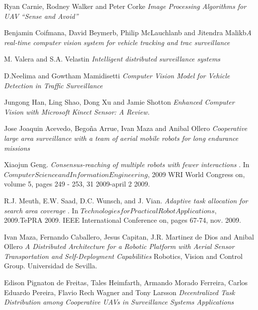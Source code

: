 \documentclass[11pt, oneside]{book} %
\begin{document}
\begin{thebibliography}{9}

 Ryan Carnie, Rodney Walker and Peter Corke \textit{Image Processing Algorithms for UAV “Sense and Avoid”} 

 Benjamin Coifmana, David Beymerb, Philip McLauchlanb and Jitendra Malikb\textit{A real-time computer vision system for vehicle tracking and trac surveillance} 

 M. Valera and S.A. Velastin \textit{Intelligent distributed surveillance systems} 

 D.Neelima and Gowtham Mamidisetti \textit{Computer Vision Model for Vehicle Detection in Traffic Surveillance} 

 Jungong Han, Ling Shao, Dong Xu and Jamie Shotton \textit{Enhanced Computer Vision with Microsoft Kinect Sensor: A Review.} 

 Jose Joaquin Acevedo, Bego\~na Arrue, Ivan Maza and Anibal Ollero \textit{Cooperative large area surveillance with a team of aerial mobile robots for long endurance missions}


 Xiaojun Geng. \textit{ Consensus-reaching of multiple robots with fewer interactions }. In $Computer Science and Information Engineering$, 2009 WRI World Congress on, volume 5, pages 249 - 253, 31 2009-april 2 2009.

 R.J. Meuth, E.W. Saad, D.C. Wunsch, and J. Vian. \textit{Adaptive task allocation for search area coverage} . In $Technologies for Practical Robot Applications$, 2009.TePRA 2009. IEEE International Conference on, pages 67-74, nov. 2009.

 Ivan Maza, Fernando Caballero, Jesus Capitan, J.R. Martinez de Dios and Anibal Ollero \textit{A Distributed Architecture for a Robotic Platform with Aerial Sensor Transportation and Self-Deployment Capabilities} Robotics, Vision and Control Group. Universidad de Sevilla.

 Edison Pignaton de Freitas, Tales Heimfarth, Armando Morado Ferreira, Carlos Eduardo Pereira, Flavio Rech Wagner and Tony Larsson \textit{Decentralized Task Distribution among Cooperative UAVs in Surveillance Systems Applications}


\end{thebibliography}
\end{document}
